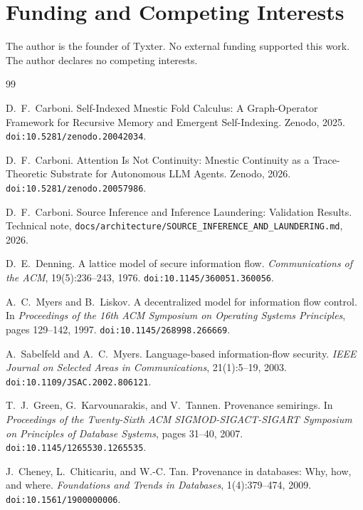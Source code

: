 \documentclass[11pt]{article}
\begin{document}
\section*{Funding and Competing Interests}

The author is the founder of Tyxter. No external funding supported this work. The author declares no competing interests.

\begin{thebibliography}{99}

D.~F.~Carboni.
\newblock Self-Indexed Mnestic Fold Calculus: A Graph-Operator Framework for Recursive Memory and Emergent Self-Indexing.
\newblock Zenodo, 2025.
\newblock \texttt{doi:10.5281/zenodo.20042034}.

D.~F.~Carboni.
\newblock Attention Is Not Continuity: Mnestic Continuity as a Trace-Theoretic Substrate for Autonomous LLM Agents.
\newblock Zenodo, 2026.
\newblock \texttt{doi:10.5281/zenodo.20057986}.

D.~F.~Carboni.
\newblock Source Inference and Inference Laundering: Validation Results.
\newblock Technical note, \texttt{docs/architecture/SOURCE\_INFERENCE\_AND\_LAUNDERING.md}, 2026.

D.~E.~Denning.
\newblock A lattice model of secure information flow.
\newblock \emph{Communications of the ACM}, 19(5):236--243, 1976.
\newblock \texttt{doi:10.1145/360051.360056}.

A.~C.~Myers and B.~Liskov.
\newblock A decentralized model for information flow control.
\newblock In \emph{Proceedings of the 16th ACM Symposium on Operating Systems Principles}, pages 129--142, 1997.
\newblock \texttt{doi:10.1145/268998.266669}.

A.~Sabelfeld and A.~C.~Myers.
\newblock Language-based information-flow security.
\newblock \emph{IEEE Journal on Selected Areas in Communications}, 21(1):5--19, 2003.
\newblock \texttt{doi:10.1109/JSAC.2002.806121}.

T.~J.~Green, G.~Karvounarakis, and V.~Tannen.
\newblock Provenance semirings.
\newblock In \emph{Proceedings of the Twenty-Sixth ACM SIGMOD-SIGACT-SIGART Symposium on Principles of Database Systems}, pages 31--40, 2007.
\newblock \texttt{doi:10.1145/1265530.1265535}.

J.~Cheney, L.~Chiticariu, and W.-C. Tan.
\newblock Provenance in databases: Why, how, and where.
\newblock \emph{Foundations and Trends in Databases}, 1(4):379--474, 2009.
\newblock \texttt{doi:10.1561/1900000006}.


\end{thebibliography}
\end{document}
